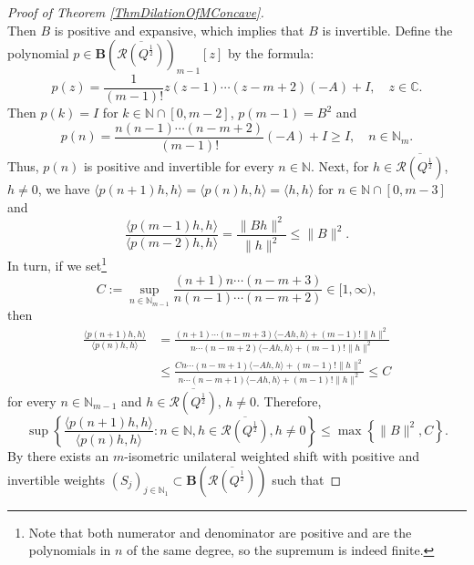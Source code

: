 \documentclass{amsart}
\renewcommand{\le}{\leqslant}
\renewcommand{\ge}{\geqslant}
\theoremstyle{definition}
\numberwithin{equation}{section}
\begin{document}
\begin{proof}[Proof of Theorem \ref{ThmDilationOfMConcave}]
\begin{equation*}
    \end{equation*}
    Then $ B $ is positive and expansive, which implies that $ B $ is invertible. Define the polynomial $ p\in \mathbf{B}(\overline{\mathcal{R}(Q^{\frac{1}{2}})})_{m-1}[z] $ by the formula:
    \begin{equation*}
        p(z) = \frac{1}{(m-1)!}z(z-1)\cdots(z-m+2)(-A)+I, \quad z\in \mathbb{C}.
    \end{equation*}
    Then $ p(k) = I $ for $ k\in \mathbb{N}\cap[0,m-2] $, $ p(m-1) = B^{2} $ and
    \begin{equation*}
        p(n) = \frac{n(n-1)\cdots (n-m+2)}{(m-1)!}(-A)+I\ge I, \quad n\in \mathbb{N}_{m}.
    \end{equation*}
    Thus, $ p(n) $ is positive and invertible for every $ n\in \mathbb{N} $. Next, for $ h\in \overline{\mathcal{R}(Q^{\frac{1}{2}})} $, $ h\not=0 $, we have $ \langle p(n+1)h,h\rangle = \langle p(n)h,h\rangle = \langle h,h\rangle $ for $ n\in \mathbb{N}\cap[0,m-3] $ and
    \begin{equation*}
        \frac{\langle p(m-1)h,h\rangle}{\langle p(m-2)h,h\rangle} = \frac{\lVert Bh\rVert^{2}}{\lVert h\rVert^{2}} \le \lVert B \rVert^{2}.
    \end{equation*}
    In turn, if we set\footnote{Note that both numerator and denominator are positive and are the polynomials in $ n $ of the same degree, so the supremum is indeed finite.}
    \begin{equation*}
        C:= \sup_{n\in \mathbb{N}_{m-1}} \frac{(n+1)n\cdots(n-m+3)}{n(n-1)\cdots(n-m+2)} \in [1,\infty),
    \end{equation*}
    then
    \begin{align*}
        \frac{\langle p(n+1)h,h\rangle}{\langle p(n)h,h\rangle} &= \frac{(n+1)\cdots(n-m+3)\langle -Ah,h\rangle + (m-1)!\lVert h\rVert^{2}}{n\cdots(n-m+2)\langle -Ah,h\rangle + (m-1)!\lVert h\rVert^{2}}\\
        &\le \frac{Cn\cdots(n-m+1)\langle -Ah,h\rangle + (m-1)!\lVert h\rVert^{2}}{n\cdots(n-m+1)\langle -Ah,h\rangle + (m-1)!\lVert h\rVert^{2}} \le C
    \end{align*}
    for every $ n\in \mathbb{N}_{m-1} $ and $ h\in \overline{\mathcal{R}(Q^{\frac{1}{2}})} $, $ h\not=0 $. Therefore,
    \begin{equation*}
        \sup\left\{ \frac{\langle p(n+1)h,h\rangle}{\langle p(n)h,h\rangle}\colon n\in \mathbb{N}, h\in \overline{\mathcal{R}(Q^{\frac{1}{2}})}, h\not=0 \right\} \le \max\left\{ \lVert B\rVert^{2},C \right\}.
    \end{equation*} By \cite[Theorem 3.4]{buchalaMIsometricShiftsOperatorWeights} there exists an $ m $-isometric unilateral weighted shift with positive and invertible weights $ (S_{j})_{j\in \mathbb{N}_{1}}\subset \mathbf{B}(\overline{\mathcal{R}(Q^{\frac{1}{2}})}) $ such that

\end{proof}
\end{document}
